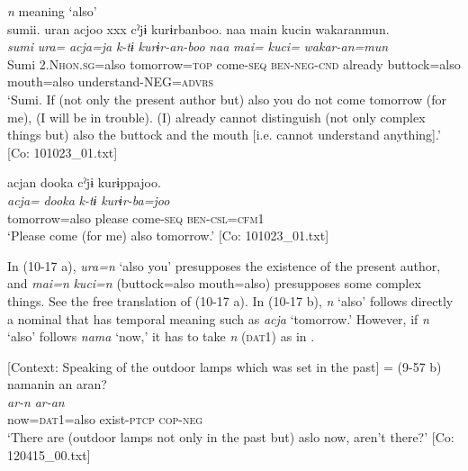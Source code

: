 \ea\label{ex:10.17}   \textit{n} meaning ‘also’\\
  \ea  %
      \glll    sumii.  uran  acjoo  xxx  cˀjɨ  kurɨrbanboo.  naa  main  kucin  wakaranmun.\\
      \textit{sumi}  \textit{ura=}  \textit{acja=ja}    \textit{k-tɨ}  \textit{kurɨr-an-boo}   \textit{naa}  \textit{mai=}  \textit{kuci=}  \textit{wakar-an=mun}\\
      Sumi  2.N\textsc{hon}.\textsc{sg}=also  tomorrow=\textsc{top}    come{}-\textsc{seq}  \textsc{ben}-\textsc{neg}-\textsc{cnd}    already  buttock=also  mouth=also  understand-NEG=\textsc{advrs}\\
      \glt       ‘Sumi. If (not only the present author but) also you do not come tomorrow (for me), (I will be in trouble). (I) already cannot distinguish (not only complex things but) also the buttock and the mouth [i.e. cannot understand anything].’ [Co: 101023\_01.txt]

  \ex  %
      \glll    acjan  dooka  cˀjɨ  kurɨppajoo.\\
      \textit{acja=}  \textit{dooka}  \textit{k-tɨ}  \textit{kurɨr-ba=joo}\\
      tomorrow=also  please  come-\textsc{seq}  \textsc{ben}-\textsc{csl}=\textsc{cfm}1\\
      \glt       ‘Please come (for me) also tomorrow.’ [Co: 101023\_01.txt]
    \z
\z

In (10-17 a), \textit{ura=n} ‘also you’ presupposes the existence of the present author, and \textit{mai=n} \textit{kuci=n} (buttock=also mouth=also) presupposes some complex things. See the free translation of (10-17 a). In (10-17 b), \textit{n} ‘also’ follows directly a nominal that has temporal meaning such as \textit{acja} ‘tomorrow.’ However, if \textit{n} ‘also’ follows \textit{nama} ‘now,’ it has to take \textit{n} (\textsc{dat}1) as in .

\ea\label{ex:10.18}   [Context: Speaking of the outdoor lamps which was set in the past] = (9-57 b)\\
      \glll    namanin  an  aran?\\
    \textit{}  \textit{ar-n}  \textit{ar-an}\\
    now=\textsc{dat}1=also  exist-\textsc{ptcp}  \textsc{cop}-\textsc{neg}\\
\glt     ‘There are (outdoor lamps not only in the past but) aslo now, aren’t there?’  [Co: 120415\_00.txt]
\z

